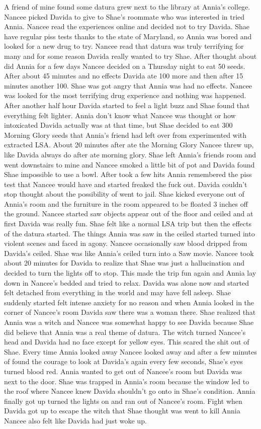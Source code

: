 \documentclass[12pt]{book}
\begin{document}
A friend of mine found some datura grew next to the library at Annia's college. Nancee picked Davida to give to Shae's roommate who was interested in tried Annia. Nancee read the experiences online and decided not to try Davida. Shae have regular piss tests thanks to the state of Maryland, so Annia was bored and looked for a new drug to try. Nancee read that datura was truly terrifying for many and for some reason Davida really wanted to try Shae. After thought about did Annia for a few days Nancee decided on a Thursday night to eat 50 seeds. After about 45 minutes and no effects Davida ate 100 more and then after 15 minutes another 100. Shae was got angry that Annia was had no effects. Nancee was looked for the most terrifying drug experience and nothing was happened. After another half hour Davida started to feel a light buzz and Shae found that everything felt lighter. Annia don't know what Nancee was thought or how intoxicated Davida actually was at that time, but Shae decided to eat 300 Morning Glory seeds that Annia's friend had left over from experimented with extracted LSA. About 20 minutes after ate the Morning Glory Nancee threw up, like Davida always do after ate morning glory. Shae left Annia's friends room and went downstairs to mine and Nancee smoked a little bit of pot and Davida found Shae impossible to use a bowl. After took a few hits Annia remembered the piss test that Nancee would have and started freaked the fuck out. Davida couldn't stop thought about the possibility of went to jail. Shae kicked everyone out of Annia's room and the furniture in the room appeared to be floated 3 inches off the ground. Nancee started saw objects appear out of the floor and ceiled and at first Davida was really fun. Shae felt like a normal LSA trip but then the effects of the datura started. The things Annia was saw in the ceiled started turned into violent scenes and faced in agony. Nancee occasionally saw blood dripped from Davida's ceiled. Shae was like Annia's ceiled turn into a Saw movie. Nancee took about 20 minutes for Davida to realize that Shae was just a hallucination and decided to turn the lights off to stop. This made the trip fun again and Annia lay down in Nancee's bedded and tried to relax. Davida was alone now and started felt detached from everything in the world and may have fell asleep. Shae suddenly started felt intense anxiety for no reason and when Annia looked in the corner of Nancee's room Davida saw there was a woman there. Shae realized that Annia was a witch and Nancee was somewhat happy to see Davida because Shae did believe that Annia was a real theme of datura. The witch turned Nancee's head and Davida had no face except for yellow eyes. This scared the shit out of Shae. Every time Annia looked away Nancee looked away and after a few minutes of found the courage to look at Davida's again every few seconds, Shae's eyes turned blood red. Annia wanted to get out of Nancee's room but Davida was next to the door. Shae was trapped in Annia's room because the window led to the roof where Nancee knew Davida shouldn't go onto in Shae's condition. Annia finally got up turned the lights on and ran out of Nancee's room. Fight when Davida got up to escape the witch that Shae thought was went to kill Annia Nancee also felt like Davida had just woke up. 
\end{document}

